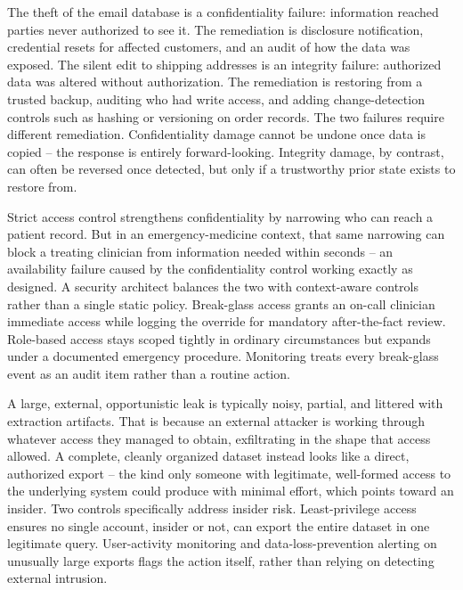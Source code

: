 \begin{answerkey}
\item The theft of the email database is a confidentiality failure: information reached parties
never authorized to see it. The remediation is disclosure notification, credential resets for
affected customers, and an audit of how the data was exposed. The silent edit to shipping addresses
is an integrity failure: authorized data was altered without authorization. The remediation is
restoring from a trusted backup, auditing who had write access, and adding change-detection
controls such as hashing or versioning on order records. The two failures require different
remediation. Confidentiality damage cannot be undone once data is copied -- the response is
entirely forward-looking. Integrity damage, by contrast, can often be reversed once detected, but
only if a trustworthy prior state exists to restore from.
\item Strict access control strengthens confidentiality by narrowing who can reach a patient
record. But in an emergency-medicine context, that same narrowing can block a treating clinician
from information needed within seconds -- an availability failure caused by the confidentiality
control working exactly as designed. A security architect balances the two with
context-aware controls rather than a single static policy. Break-glass access grants an
on-call clinician immediate access while logging the override for mandatory after-the-fact review.
Role-based access stays scoped tightly in ordinary circumstances but expands under a documented
emergency procedure. Monitoring treats every break-glass event as an audit item rather
than a routine action.
\item A large, external, opportunistic leak is typically noisy, partial, and littered with
extraction artifacts. That is because an external attacker is working through whatever access they
managed to obtain, exfiltrating in the shape that access allowed. A complete, cleanly organized
dataset instead looks like a direct, authorized export -- the kind only someone with legitimate,
well-formed access to the underlying system could produce with minimal effort, which points toward
an insider. Two controls specifically address insider risk. Least-privilege access ensures no
single account, insider or not, can export the entire dataset in one legitimate query.
User-activity monitoring and data-loss-prevention alerting on unusually large exports flags
the action itself, rather than relying on detecting external intrusion.

\end{answerkey}
